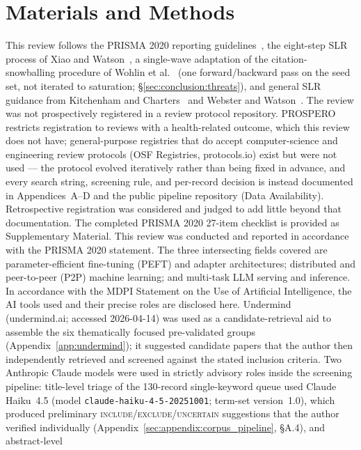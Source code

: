 \section{Materials and Methods}
\label{sec:methodology}

This review follows the PRISMA 2020 reporting guidelines~\cite{Page2021}, the
eight-step SLR process of Xiao and Watson~\cite{XiaoWatson2019}, a single-wave
adaptation of the citation-snowballing procedure of Wohlin et
al.~\cite{Wohlin2014} (one forward/backward pass on the seed set, not iterated
to saturation; \S\ref{sec:conclusion:threats}), and general
SLR guidance from Kitchenham and Charters~\cite{KitchenhamCharters2007} and
Webster and Watson~\cite{Webster2002}. The review was
not prospectively registered in a review protocol repository. PROSPERO
restricts registration to reviews with a health-related outcome, which this
review does not have; general-purpose registries that do accept
computer-science and engineering review protocols (OSF Registries,
protocols.io) exist but were not used --- the protocol evolved iteratively
rather than being fixed in advance, and every search string, screening rule,
and per-record decision is instead documented in Appendices~A--D and the
public pipeline repository (Data Availability). Retrospective registration was
considered and judged to add little beyond that documentation. The completed
PRISMA 2020 27-item checklist is provided as Supplementary Material. This
review was conducted and reported in accordance with the PRISMA 2020 statement.
The three intersecting fields covered are parameter-efficient fine-tuning (PEFT) and
adapter architectures; distributed and peer-to-peer (P2P) machine learning;
and multi-task LLM serving and inference. In accordance with the MDPI
Statement on the Use of Artificial Intelligence, the AI tools used and their
precise roles are disclosed here. Undermind (undermind.ai; accessed
2026-04-14) was used as a candidate-retrieval aid to assemble the six
thematically focused pre-validated groups (Appendix~\ref{app:undermind}); it
suggested candidate papers that the author then independently retrieved and
screened against the stated inclusion criteria. Two Anthropic Claude models
were used in strictly advisory roles inside the screening pipeline:
title-level triage of the 130-record single-keyword queue used Claude
Haiku~4.5 (model \texttt{claude-haiku-4-5-20251001}; term-set version~1.0),
which produced preliminary \textsc{include}/\textsc{exclude}/\textsc{uncertain}
suggestions that the author verified individually
(Appendix~\ref{sec:appendix:corpus_pipeline}, \S A.4), and abstract-level
